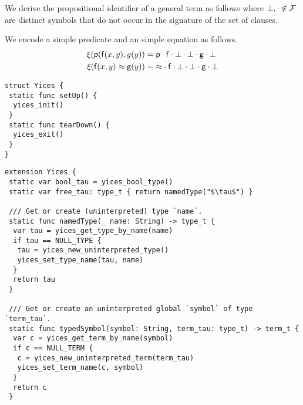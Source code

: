 \begin{definition}
	We derive the propositional identifier of a general term as follows
where $\bot, \cdot\not\in{\mathcal F}$ are distinct symbols that do not occur in the signature of the set of clauses.
\end{definition}

\begin{example}
	We encode a simple predicate and an simple equation as follows.
	\begin{align*}
	\xi({\mathsf p}({\mathsf f}(x,y),g(y)) &= {\mathsf p}\cdot{\mathsf f}\cdot\bot\cdot\bot\cdot{\mathsf g}\cdot\bot\\
	\xi({\mathsf f}(x,y)\approx {\mathsf g}(y)) &= {\approx}\cdot{\mathsf f}\cdot\bot\cdot\bot\cdot{\mathsf g}\cdot\bot\\
	\end{align*}
\end{example}


\begin{lstlisting}[language=FLEA]
struct Yices {
 static func setUp() {
  yices_init()
 }
 static func tearDown() {
  yices_exit()
 }
}
\end{lstlisting}

\begin{lstlisting}[language=FLEA]
extension Yices {
 static var bool_tau = yices_bool_type()
 static var free_tau: type_t { return namedType("$\tau$") }
 
 /// Get or create (uninterpreted) type `name`.
 static func namedType(_ name: String) -> type_t {
  var tau = yices_get_type_by_name(name)
  if tau == NULL_TYPE {
   tau = yices_new_uninterpreted_type()
   yices_set_type_name(tau, name)
  }
  return tau
 }
 
 /// Get or create an uninterpreted global `symbol` of type `term_tau`.
 static func typedSymbol(symbol: String, term_tau: type_t) -> term_t {
  var c = yices_get_term_by_name(symbol)
  if c == NULL_TERM {
   c = yices_new_uninterpreted_term(term_tau)
   yices_set_term_name(c, symbol)
  } 
  return c
 }
\end{lstlisting}


